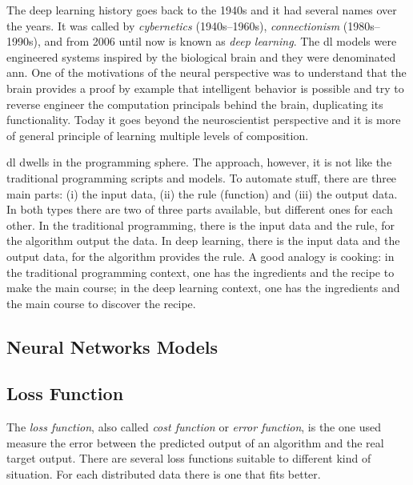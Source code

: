 The deep learning history goes back to the 1940s and it had several names over the years. 
It was called by \emph{cybernetics} (1940s--1960s), \emph{connectionism} (1980s--1990s), and from 2006 until now is known as \emph{deep learning}.
The \gls*{dl} models were engineered systems inspired by the biological brain and they were denominated \gls*{ann}.
One of the motivations of the neural  perspective was to understand that the brain provides a proof by example that intelligent behavior is possible and try to reverse engineer the computation principals behind the brain, duplicating its functionality.
Today it goes beyond the neuroscientist perspective and it is more of general principle of learning multiple levels of composition.

\gls*{dl} dwells in the programming sphere. The approach, however, it is not like the traditional programming scripts and models. To automate stuff, there are three main parts: (i) the input data, (ii) the rule (function) and (iii) the output data. In both types there are two of three parts available, but different ones for each other. In the traditional programming, there is the input data and the rule, for the algorithm output the data. In deep learning, there is the input data and the output data, for the algorithm provides the rule. A good analogy is cooking: in the traditional programming context, one has the ingredients and the recipe to make the main course; in the deep learning context, one has the ingredients and the main course to discover the recipe.

\subsection{Neural Networks Models}

\subsection{Loss Function}

The \emph{loss function}, also called \emph{cost function} or \emph{error function}, is the one used measure the error between the predicted output of an algorithm and the real target output. 
There are several loss functions suitable to different kind of situation. For each distributed data there is one that fits better.

